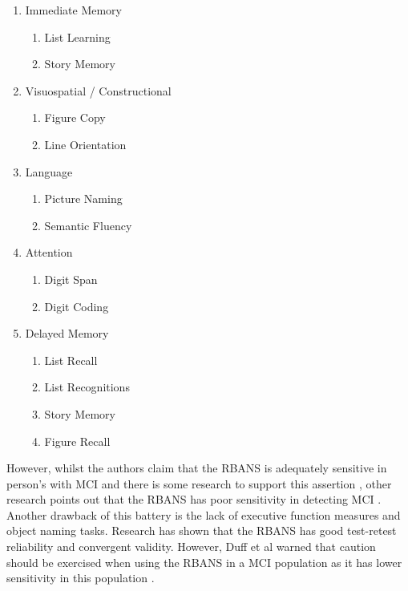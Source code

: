 \begin{enumerate}
	\item Immediate Memory 
	\begin{enumerate}
		\item{List Learning}
		\item{Story Memory}
	\end{enumerate}
	\item Visuospatial / Constructional
	\begin{enumerate}
		\item{Figure Copy}
		\item{Line Orientation}
	\end{enumerate}
	\item Language
	\begin{enumerate}
		\item{Picture Naming}
		\item{Semantic Fluency}
	\end{enumerate}
	\item Attention
	\begin{enumerate}
		\item{Digit Span}
		\item{Digit Coding}
	\end{enumerate}
	\item Delayed Memory
	\begin{enumerate}
		\item{List Recall}
		\item{List Recognitions}
		\item{Story Memory}
		\item{Figure Recall}
	\end{enumerate}
\end{enumerate}

However, whilst the authors claim that the RBANS is adequately sensitive in person's with MCI \cite{Randolph1998} and there is some research to support this assertion \cite{Karantzoulis2013}, other research points out that the RBANS has poor sensitivity in detecting MCI \cite{Duff2010}. Another drawback of this battery is the lack of executive function measures and object naming tasks. Research has shown that the RBANS has good test-retest reliability and convergent validity. However, Duff et al warned that caution should be exercised when using the RBANS in a MCI population as it has lower sensitivity in this population \cite{Duff2010}.


